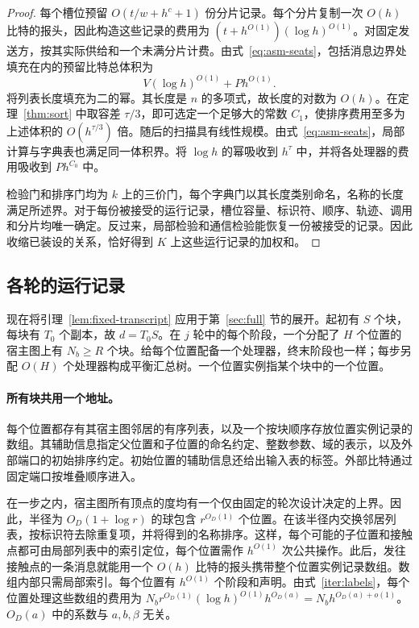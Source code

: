 \begin{proof}
每个槽位预留 $O(t/w+h^c+1)$ 份分片记录。每个分片复制一次 $O(h)$ 比特的报头，因此构造这些记录的费用为 $(t+h^{O(1)})(\log h)^{O(1)}$。对固定发送方，按其实际供给和一个未满分片计费。由式~\eqref{eq:asm-seats}，包括消息边界处填充在内的预留比特总体积为
\[
                     V(\log h)^{O(1)}+P h^{O(1)} .
\]
将列表长度填充为二的幂。其长度是 $n$ 的多项式，故长度的对数为 $O(h)$。在定理~\ref{thm:sort} 中取容差 $\tau/3$，即可选定一个足够大的常数 $C_1$，使排序费用至多为上述体积的 $O(h^{\tau/3})$ 倍。随后的扫描具有线性规模。由式~\eqref{eq:asm-seats}，局部计算与字典表也满足同一体积界。将 $\log h$ 的幂吸收到 $h^\tau$ 中，并将各处理器的费用吸收到 $P h^{C_0}$ 中。

检验门和排序门均为 $k$ 上的三价门，每个字典门以其长度类别命名，名称的长度满足所述界。对于每份被接受的运行记录，槽位容量、标识符、顺序、轨迹、调用和分片均唯一确定。反过来，局部检验和通信检验能恢复一份被接受的记录。因此收缩已装设的关系，恰好得到 $K$ 上这些运行记录的加权和。
\end{proof}

\subsection{各轮的运行记录}

现在将引理~\ref{lem:fixed-transcript} 应用于第~\ref{sec:full} 节的展开。起初有 $S$ 个块，每块有 $T_0$ 个副本，故 $d=T_0S$。在 $j$ 轮中的每个阶段，一个分配了 $H$ 个位置的宿主图上有 $N_b\ge R$ 个块。给每个位置配备一个处理器，终末阶段也一样；每步另配 $O(H)$ 个处理器构成平衡汇总树。一个位置实例指某个块中的一个位置。

\paragraph{所有块共用一个地址。}
每个位置都存有其宿主图邻居的有序列表，以及一个按块顺序存放位置实例记录的数组。其辅助信息指定父位置和子位置的命名约定、整数参数、域的表示，以及外部端口的初始排序约定。初始位置的辅助信息还给出输入表的标签。外部比特通过固定端口按堆叠顺序进入。

在一步之内，宿主图所有顶点的度均有一个仅由固定的轮次设计决定的上界。因此，半径为 $O_D(1+\log r)$ 的球包含 $r^{O_D(1)}$ 个位置。在该半径内交换邻居列表，按标识符去除重复项，并将得到的名称排序。这样，每个可能的子位置和接触点都可由局部列表中的索引定位，每个位置需作 $h^{O(1)}$ 次公共操作。此后，发往接触点的一条消息就能用一个 $O(h)$ 比特的报头携带整个位置实例记录数组。数组内部只需局部索引。每个位置有 $h^{O(1)}$ 个阶段和声明。由式~\eqref{iter:labels}，每个位置处理这些数组的费用为 $N_b r^{O_D(1)}(\log h)^{O(1)}h^{O_D(a)}
=N_b h^{O_D(a)+o(1)}$。$O_D(a)$ 中的系数与 $a,b,\beta$ 无关。

